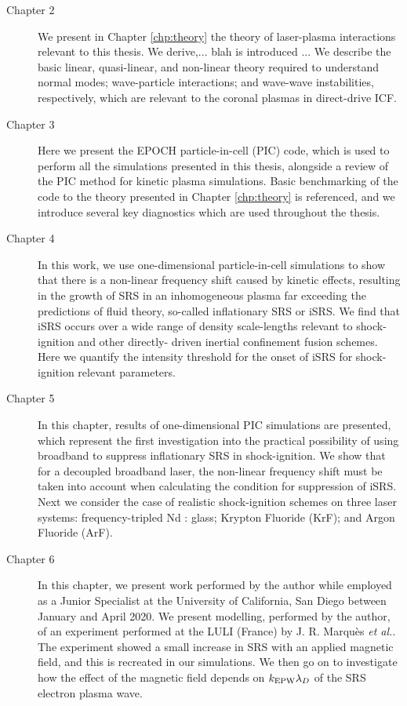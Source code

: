 \begin{description}
	\item[Chapter 2] We present in Chapter \ref{chp:theory} the theory of laser-plasma interactions relevant to this thesis. We derive,... blah is introduced ... We describe the basic linear, quasi-linear, and non-linear theory required to understand normal modes; wave-particle interactions; and wave-wave instabilities, respectively, which are relevant to the coronal plasmas in direct-drive ICF.
	
	\item[Chapter 3] Here we present the EPOCH particle-in-cell (\acrshort{PIC}) code, which is used to perform all the simulations presented in this thesis, alongside a review of the PIC method for kinetic plasma simulations. Basic benchmarking of the code to the theory presented in Chapter \ref{chp:theory} is referenced, and we introduce several key diagnostics which are used throughout the thesis.
	 
	\item[Chapter 4] In this work, we use one-dimensional particle-in-cell 		
		simulations to show that there is a non-linear frequency shift caused  
		by kinetic effects, resulting in the growth of SRS in an inhomogeneous 
		plasma far exceeding the predictions of fluid theory, so-called 
		inflationary SRS or iSRS. We find that iSRS occurs over a wide range of 
		density scale-lengths relevant to shock-ignition and other directly-
		driven inertial confinement fusion schemes. Here we quantify the 
		intensity threshold for the onset of iSRS for shock-ignition relevant 
		parameters.
	
	\item[Chapter 5] In this chapter, results of one-dimensional PIC simulations are presented, which represent the first investigation into the practical possibility of using broadband to suppress inflationary SRS in shock-ignition. We show that for a decoupled broadband laser, the non-linear frequency shift must be taken into account when calculating the condition for suppression of iSRS. Next we consider the case of realistic shock-ignition schemes on three laser systems: frequency-tripled Nd : glass; Krypton Fluoride (KrF); and Argon Fluoride (ArF).
	\item[Chapter 6] In this chapter, we present work performed by the author while employed as a Junior Specialist at the University of California, San Diego between January and April 2020. We present modelling, performed by the author, of an experiment performed at the \acrlong{LULI} (France) by J. R. Marqu\`es \textit{et al.}. The experiment showed a small increase in SRS with an applied magnetic field, and this is recreated in our simulations. We then go on to investigate how the effect of the magnetic field depends on $k_\mathrm{EPW}\lambda_D$ of the SRS electron plasma wave.
\end{description}

